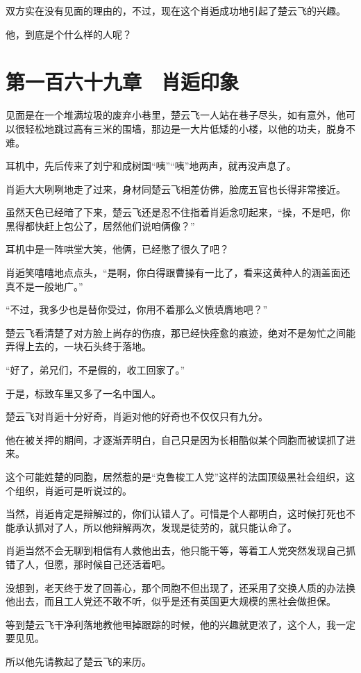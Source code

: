 双方实在没有见面的理由的，不过，现在这个肖逅成功地引起了楚云飞的兴趣。

他，到底是个什么样的人呢？

\section{第一百六十九章　肖逅印象}

见面是在一个堆满垃圾的废弃小巷里，楚云飞一人站在巷子尽头，如有意外，他可以很轻松地跳过高有三米的围墙，那边是一大片低矮的小楼，以他的功夫，脱身不难。

耳机中，先后传来了刘宁和成树国“咦”“咦”地两声，就再没声息了。

肖逅大大咧咧地走了过来，身材同楚云飞相差仿佛，脸庞五官也长得非常接近。

虽然天色已经暗了下来，楚云飞还是忍不住指着肖逅念叨起来，“操，不是吧，你黑得都快赶上包公了，居然他们说咱俩像？”

耳机中是一阵哄堂大笑，他俩，已经憋了很久了吧？

肖逅笑嘻嘻地点点头，“是啊，你白得跟曹操有一比了，看来这黄种人的涵盖面还真不是一般地广。”

“不过，我多少也是替你受过，你用不着那么义愤填膺地吧？”

楚云飞看清楚了对方脸上尚存的伤痕，那已经快痊愈的痕迹，绝对不是匆忙之间能弄得上去的，一块石头终于落地。

“好了，弟兄们，不是假的，收工回家了。”

于是，标致车里又多了一名中国人。

楚云飞对肖逅十分好奇，肖逅对他的好奇也不仅仅只有九分。

他在被关押的期间，才逐渐弄明白，自己只是因为长相酷似某个同胞而被误抓了进来。

这个可能姓楚的同胞，居然惹的是“克鲁梭工人党”这样的法国顶级黑社会组织，这个组织，肖逅可是听说过的。

当然，肖逅肯定是辩解过的，你们认错人了。可惜是个人都明白，这时候打死也不能承认抓对了人，所以他辩解两次，发现是徒劳的，就只能认命了。

肖逅当然不会无聊到相信有人救他出去，他只能干等，等着工人党突然发现自己抓错了人，但愿，那时候自己还活着吧。

没想到，老天终于发了回善心，那个同胞不但出现了，还采用了交换人质的办法换他出去，而且工人党还不敢不听，似乎是还有英国更大规模的黑社会做担保。

等到楚云飞干净利落地教他甩掉跟踪的时候，他的兴趣就更浓了，这个人，我一定要见见。

所以他先请教起了楚云飞的来历。

